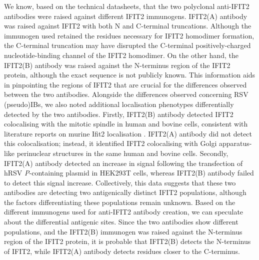 We know, based on the technical datasheets, that the two polyclonal anti-IFIT2 antibodies were raised against different IFIT2 immunogens. IFIT2(A) antibody was raised against IFIT2 with both N and C-terminal truncations. Although the immunogen used retained the residues necessary for IFIT2 homodimer formation, the C-terminal truncation may have disrupted the C-terminal positively-charged nucleotide-binding channel of the IFIT2 homodimer. On the other hand, the IFIT2(B) antibody was raised against the N-terminus region of the IFIT2 protein, although the exact sequence is not publicly known. This information aids in pinpointing the regions of IFIT2 that are crucial for the differences observed between the two antibodies. Alongside the differences observed concerning RSV (pseudo)IBs, we also noted additional localisation phenotypes differentially detected by the two antibodies. Firstly, IFIT2(B) antibody detected IFIT2 colocalising with the mitotic spindle in human and bovine cells, consistent with literature reports on murine Ifit2 localisation \cite{Saha2006IdentificationProtein}. IFIT2(A) antibody did not detect this colocalisation; instead, it identified IFIT2 colocalising with Golgi apparatus-like perinuclear structures in the same human and bovine cells. Secondly, IFIT2(A) antibody detected an increase in signal following the transfection of hRSV \textit{P}-containing plasmid in HEK293T cells, whereas IFIT2(B) antibody failed to detect this signal increase. Collectively, this data suggests that these two antibodies are detecting two antigenically distinct IFIT2 populations, although the factors differentiating these populations remain unknown. Based on the different immunogens used for anti-IFIT2 antibody creation, we can speculate about the differential antigenic sites. Since the two antibodies show different populations, and the IFIT2(B) immunogen was raised against the N-terminus region of the IFIT2 protein, it is probable that IFIT2(B) detects the N-terminus of IFIT2, while IFIT2(A) antibody detects residues closer to the C-terminus.

